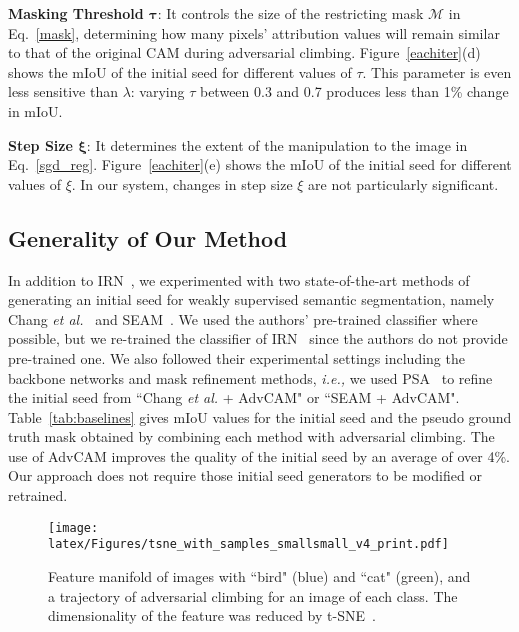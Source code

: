 \documentclass[final]{cvpr}
\begin{document}
\textbf{Masking Threshold $\boldsymbol{\tau}$}: It controls the size of the restricting mask $\mathcal{M}$ in Eq.~\ref{mask}, determining how many pixels' attribution values will remain similar to that of the original CAM during adversarial climbing.
Figure~\ref{eachiter}(d) shows the mIoU of the initial seed for different values of $\tau$. This parameter is even less sensitive than $\lambda$: varying $\tau$ between 0.3 and 0.7 produces less than 1\% change in mIoU.

\textbf{Step Size $\boldsymbol{\xi}$}: It determines the extent of the manipulation to the image in Eq.~\ref{sgd_reg}. Figure~\ref{eachiter}(e) shows the mIoU of the initial seed for different values of $\xi$. In our system, changes in step size $\xi$ are not particularly significant.



\subsection{Generality of Our Method}\label{generality}
In addition to IRN~\cite{ahn2019weakly}, we experimented with two state-of-the-art methods of generating an initial seed for weakly supervised semantic segmentation, namely Chang \textit{et al.}~\cite{chang2020weakly} and SEAM~\cite{wang2020self}. 
We used the authors' pre-trained classifier where possible, but we re-trained the classifier of IRN~\cite{ahn2019weakly} since the authors do not provide pre-trained one. We also followed their experimental settings including the backbone networks and mask refinement methods, \textit{i.e.,} we used PSA~\cite{ahn2018learning} to refine the initial seed from ``Chang \textit{et al.} + AdvCAM" or ``SEAM + AdvCAM".
Table~\ref{tab:baselines} gives mIoU values for the initial seed and the pseudo ground truth mask obtained by combining each method with adversarial climbing. The use of AdvCAM improves the quality of the initial seed by an average of over 4\%. 
Our approach does not require those initial seed generators to be modified or retrained.


\begin{figure}[t]
\centering
\texttt{[image: latex/Figures/tsne\_with\_samples\_smallsmall\_v4\_print.pdf]}
\caption{\label{fig_tsne} Feature manifold of images with ``bird" (blue) and ``cat" (green), and a trajectory of adversarial climbing for an image of each class. The dimensionality of the feature was reduced by t-SNE~\cite{maaten2008visualizing}.
}
\vspace{-1em}
\end{figure}
 
\end{document}
